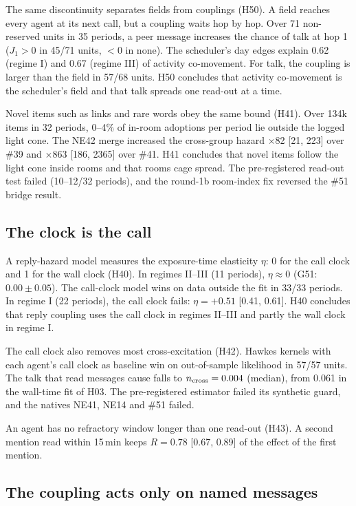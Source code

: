 The same discontinuity separates fields from couplings (H50). A field reaches every agent at its next call, but a coupling waits hop by hop. Over 71 non-reserved units in 35 periods, a peer message increases the chance of talk at hop 1 ($J_1>0$ in 45/71 units, $<0$ in none). The scheduler's day edges explain 0.62 (regime I) and 0.67 (regime III) of activity co-movement. For talk, the coupling is larger than the field in 57/68 units. H50 concludes that activity co-movement is the scheduler's field and that talk spreads one read-out at a time.

Novel items such as links and rare words obey the same bound (H41). Over 134k items in 32 periods, 0--4\% of in-room adoptions per period lie outside the logged light cone. The NE42 merge increased the cross-group hazard $\times$82 [21, 223] over \#39 and $\times$863 [186, 2365] over \#41. H41 concludes that novel items follow the light cone inside rooms and that rooms cage spread. The pre-registered read-out test failed (10--12/32 periods), and the round-1b room-index fix reversed the \#51 bridge result.

\subsection{The clock is the call}
\label{sec:coupling-clock}

A reply-hazard model measures the exposure-time elasticity $\eta$: 0 for the call clock and 1 for the wall clock (H40). In regimes II--III (11 periods), $\eta\approx0$ (G51: $0.00\pm0.05$). The call-clock model wins on data outside the fit in 33/33 periods. In regime I (22 periods), the call clock fails: $\eta=+0.51$ [0.41, 0.61]. H40 concludes that reply coupling uses the call clock in regimes II--III and partly the wall clock in regime I.

The call clock also removes most cross-excitation (H42). Hawkes kernels with each agent's call clock as baseline win on out-of-sample likelihood in 57/57 units. The talk that read messages cause falls to $n_{\rm cross}=0.004$ (median), from 0.061 in the wall-time fit of H03. The pre-registered estimator failed its synthetic guard, and the natives NE41, NE14 and \#51 failed.

An agent has no refractory window longer than one read-out (H43). A second mention read within 15\,min keeps $R=0.78$ [0.67, 0.89] of the effect of the first mention.

\subsection{The coupling acts only on named messages}
\label{sec:coupling-address}

